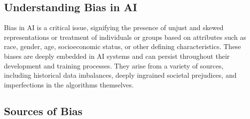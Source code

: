 \documentclass[12pt,a4paper,openright,twoside]{book}
\begin{document}
\subsection{Understanding Bias in AI}
Bias in AI is a critical issue, signifying the presence of unjust and skewed representations or treatment of individuals or groups based on attributes such as race, gender, age, socioeconomic status, or other defining characteristics. These biases are deeply embedded in AI systems and can persist throughout their development and training processes. They arise from a variety of sources, including historical data imbalances, deeply ingrained societal prejudices, and imperfections in the algorithms themselves.

\subsection{Sources of Bias}
\end{document}
